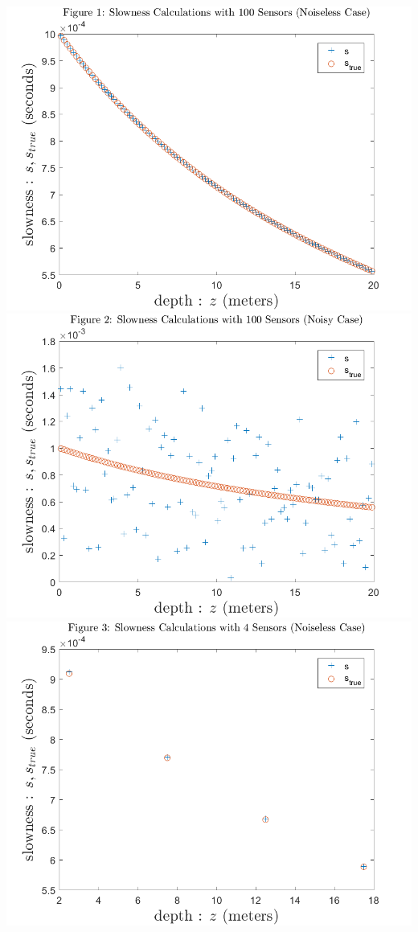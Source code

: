 \documentclass[11pt]{article}
\begin{document}
\includegraphics{Fig1.png}
\includegraphics{Fig2.png}
\includegraphics{Fig3.png}
\end{document}
